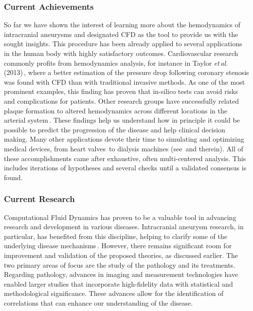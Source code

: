\subsubsection*{Current Achievements}
So far we have shown the interest of learning more about the hemodynamics of intracranial aneurysms and designated CFD as the tool to provide us with the sought insights. This procedure has been already applied to several applications in the human body with highly satisfactory outcomes. Cardiovascular research commonly profits from hemodynamics analysis, for instance in Taylor \textit{et\,al.}\,(2013)\,\cite{Taylor2013}, where a better estimation of the pressure drop following coronary stenosis was found with CFD than with traditional invasive methods. As one of the most prominent examples, this finding has proven that in-silico tests can avoid risks and complications for patients. Other research groups have successfully related plaque formation to altered hemodynamics across different locations in the arterial system\,\cite{Morbiducci2016}. These findings help us understand how in principle it could be possible to predict the progression of the disease and help clinical decision making. Many other applications devote their time to simulating and optimizing medical devices, from heart valves\,\cite{LURAGHI201745} to dialysis machines (see\,\cite{BEHBAHANI2009} and therein). All of these accomplishments came after exhaustive, often multi-centered analysis. This includes iterations of hypotheses and several checks until a validated consensus is found.

\subsubsection*{Current Research}
Computational Fluid Dynamics has proven to be a valuable tool in advancing research and development in various diseases. Intracranial aneurysm research, in particular, has benefited from this discipline, helping to clarify some of the underlying disease mechanisms\,\cite{Meng2014}. However, there remains significant room for improvement and validation of the proposed theories, as discussed earlier. The two primary areas of focus are the study of the pathology and its treatments. Regarding pathology, advances in imaging and measurement technologies have enabled larger studies that incorporate high-fidelity data with statistical and methodological significance. These advances allow for the identification of correlations that can enhance our understanding of the disease.

